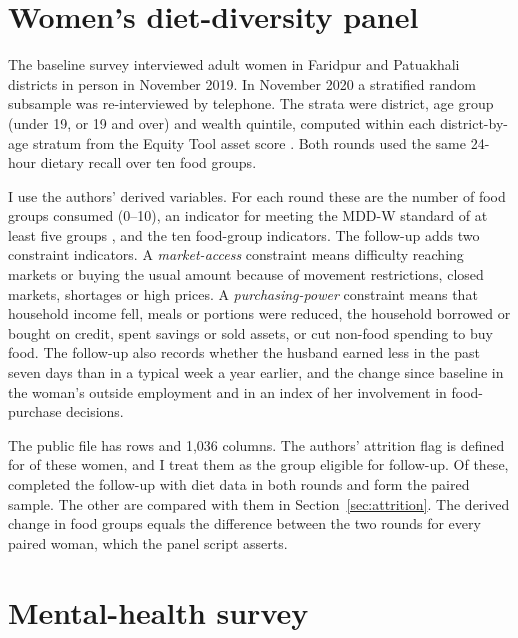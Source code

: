 \section{Women's diet-diversity panel}
The baseline survey interviewed adult women in Faridpur and Patuakhali districts in person in November 2019. In November 2020 a stratified random subsample was re-interviewed by telephone. The strata were district, age group (under 19, or 19 and over) and wealth quintile, computed within each district-by-age stratum from the Equity Tool asset score \parencite{panel2021}. Both rounds used the same 24-hour dietary recall over ten food groups.

I use the authors' derived variables. For each round these are the number of food groups consumed (0--10), an indicator for meeting the MDD-W standard of at least five groups \parencite{fao2021}, and the ten food-group indicators. The follow-up adds two constraint indicators. A \emph{market-access} constraint means difficulty reaching markets or buying the usual amount because of movement restrictions, closed markets, shortages or high prices. A \emph{purchasing-power} constraint means that household income fell, meals or portions were reduced, the household borrowed or bought on credit, spent savings or sold assets, or cut non-food spending to buy food. The follow-up also records whether the husband earned less in the past seven days than in a typical week a year earlier, and the change since baseline in the woman's outside employment and in an index of her involvement in food-purchase decisions.

The public file has \PanRaw{} rows and 1,036 columns. The authors' attrition flag is defined for \PanBase{} of these women, and I treat them as the group eligible for follow-up. Of these, \PanN{} completed the follow-up with diet data in both rounds and form the paired sample. The other \PanLost{} are compared with them in Section~\ref{sec:attrition}. The derived change in food groups equals the difference between the two rounds for every paired woman, which the panel script asserts.

\section{Mental-health survey}
